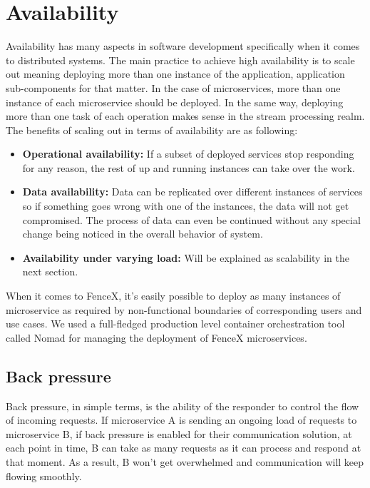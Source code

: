 \documentclass[a4]{report}
\begin{document}
    \section{Availability}
    Availability has many aspects in software development specifically when it comes to distributed systems.
    The main practice to achieve high availability is to scale out meaning deploying more than one instance of the application, application sub-components for that matter.
    In the case of microservices, more than one instance of each microservice should be deployed.
    In the same way, deploying more than one task of each operation makes sense in the stream processing realm.
    The benefits of scaling out in terms of availability are as following:
    \begin{itemize}
        \item \textbf{Operational availability:} If a subset of deployed services stop responding for any reason, the rest of up and running instances can take over the work.
        \item \textbf{Data availability:} Data can be replicated over different instances of services so if something goes wrong with one of the instances, the data will not get compromised.
        The process of data can even be continued without any special change being noticed in the overall behavior of system.
        \item \textbf{Availability under varying load:} Will be explained as scalability in the next section.
    \end{itemize}

    When it comes to FenceX, it's easily possible to deploy as many instances of microservice as required by
    non-functional boundaries of corresponding users and use cases.
    We used a full-fledged production level container orchestration tool called Nomad\cite{nomad} for managing the deployment of
    FenceX microservices.

    \subsection{Back pressure}
    Back pressure\cite{reactive-manifesto}, in simple terms, is the ability of the responder to control the flow of incoming requests.
    If microservice A is sending an ongoing load of requests to microservice B, if back pressure is enabled for
    their communication solution, at each point in time, B can take as many requests as it can process and respond at
    that moment.
    As a result, B won't get overwhelmed and communication will keep flowing smoothly.
\end{document}
